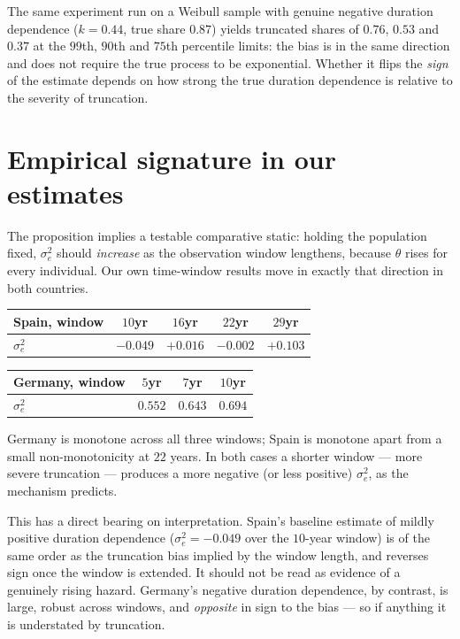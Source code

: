 \documentclass[11pt,a4paper]{article}
\begin{document}
The same experiment run on a Weibull sample with genuine negative duration
dependence ($k = 0.44$, true share $0.87$) yields truncated shares of $0.76$,
$0.53$ and $0.37$ at the $99$th, $90$th and $75$th percentile limits: the
bias is in the same direction and does not require the true process to be
exponential.  Whether it flips the \emph{sign} of the estimate depends on how
strong the true duration dependence is relative to the severity of
truncation.

\section{Empirical signature in our estimates}

The proposition implies a testable comparative static: holding the population
fixed, $\sigma^2_e$ should \emph{increase} as the observation window
lengthens, because $\theta$ rises for every individual.  Our own time-window
results move in exactly that direction in both countries.

\begin{center}
\begin{tabular}{lcccc}
\toprule
Spain, window & $10$yr & $16$yr & $22$yr & $29$yr \\
\midrule
$\sigma^2_e$ & $-0.049$ & $+0.016$ & $-0.002$ & $+0.103$ \\
\bottomrule
\end{tabular}
\qquad
\begin{tabular}{lccc}
\toprule
Germany, window & $5$yr & $7$yr & $10$yr \\
\midrule
$\sigma^2_e$ & $0.552$ & $0.643$ & $0.694$ \\
\bottomrule
\end{tabular}
\end{center}

\noindent
Germany is monotone across all three windows; Spain is monotone apart from a
small non-monotonicity at $22$ years.  In both cases a shorter window --- more
severe truncation --- produces a more negative (or less positive) $\sigma^2_e$,
as the mechanism predicts.

This has a direct bearing on interpretation.  Spain's baseline estimate of
mildly positive duration dependence ($\sigma^2_e = -0.049$ over the $10$-year
window) is of the same order as the truncation bias implied by the window
length, and reverses sign once the window is extended.  It should not be read
as evidence of a genuinely rising hazard.  Germany's negative duration
dependence, by contrast, is large, robust across windows, and \emph{opposite}
in sign to the bias --- so if anything it is understated by truncation.
\end{document}
